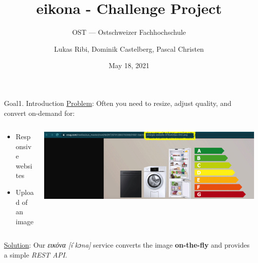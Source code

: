 \documentclass[aspectratio=169,20pt]{beamer}
\title{eikona - Challenge Project}
\subtitle{OST — Ostschweizer Fachhochschule}
\date{May 18, 2021}
\author{Lukas Ribi, Dominik Castelberg, Pascal Christen}
\institute{DS1 - Thomas Bocek }
\begin{document}
\begin{frame}
	\titlepage
\end{frame}

\begin{frame}{Goal}{1. Introduction}
	\underline{Problem}: Often you need to resize, adjust quality, and convert on-demand for:
	\vspace{1in}
	\begin{columns}[onlytextwidth,T]
		\begin{column}{.25\linewidth}
			\begin{itemize}
				\item{Responsive websites}
				\item{Upload of an image}
			\end{itemize}
		\end{column}
		\begin{column}{.65\linewidth}
			\includegraphics[scale=0.55]{vzug}
		\end{column}
	\end{columns}
	\underline{Solution}: Our \textit{εικόνα [iˈkɔna]} service converts the image \textbf{on-the-fly} and provides a simple \textit{REST API}.
\end{frame}
\end{document}
